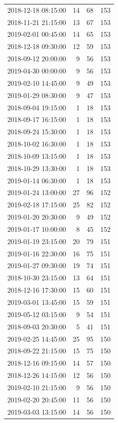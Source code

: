 \begin{tabular}{lrrr}
2018-12-18 08:15:00 & 14 & 68 & 153 \\
2018-11-21 21:15:00 & 13 & 67 & 153 \\
2019-02-01 00:45:00 & 14 & 65 & 153 \\
2018-12-18 09:30:00 & 12 & 59 & 153 \\
2018-09-12 20:00:00 & 9 & 56 & 153 \\
2019-04-30 00:00:00 & 9 & 56 & 153 \\
2019-02-10 14:45:00 & 9 & 49 & 153 \\
2019-01-29 08:30:00 & 9 & 47 & 153 \\
2018-09-04 19:15:00 & 1 & 18 & 153 \\
2018-09-17 16:15:00 & 1 & 18 & 153 \\
2018-09-24 15:30:00 & 1 & 18 & 153 \\
2018-10-02 16:30:00 & 1 & 18 & 153 \\
2018-10-09 13:15:00 & 1 & 18 & 153 \\
2018-10-29 13:30:00 & 1 & 18 & 153 \\
2019-01-14 06:30:00 & 1 & 18 & 153 \\
2019-01-24 13:00:00 & 27 & 96 & 152 \\
2019-02-18 17:15:00 & 25 & 82 & 152 \\
2019-01-20 20:30:00 & 9 & 49 & 152 \\
2019-01-17 10:00:00 & 8 & 45 & 152 \\
2019-01-19 23:15:00 & 20 & 79 & 151 \\
2019-01-16 22:30:00 & 16 & 75 & 151 \\
2019-01-27 09:30:00 & 19 & 74 & 151 \\
2018-10-30 23:15:00 & 13 & 64 & 151 \\
2018-12-16 17:30:00 & 15 & 60 & 151 \\
2019-03-01 13:45:00 & 15 & 59 & 151 \\
2019-05-12 03:15:00 & 9 & 54 & 151 \\
2018-09-03 20:30:00 & 5 & 41 & 151 \\
2019-02-25 14:45:00 & 25 & 95 & 150 \\
2018-09-22 21:15:00 & 15 & 75 & 150 \\
2018-12-16 09:15:00 & 14 & 57 & 150 \\
2018-12-26 14:15:00 & 12 & 56 & 150 \\
2019-02-10 21:15:00 & 9 & 56 & 150 \\
2019-02-20 20:45:00 & 11 & 56 & 150 \\
2019-03-03 13:15:00 & 14 & 56 & 150 \\

\end{tabular}

